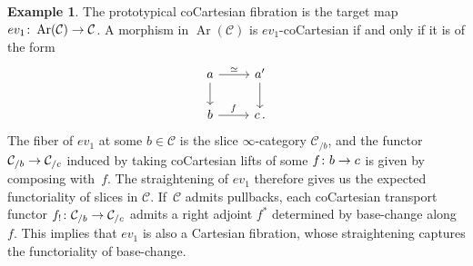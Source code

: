 \documentclass[10pt]{amsart}
\numberwithin{equation}{section}
\theoremstyle{definition}
\newtheorem{ex}[prop]{Example}
\DeclareMathOperator{\Ar}{Ar}
\newcommand{\cC}{\mathcal{C}}
\renewcommand{\to}{\mathchoice{\longrightarrow}{\rightarrow}{}{}}
\begin{document}
	\begin{ex}\label{ex:ev_0_is_cocart}
		The prototypical coCartesian fibration is the target map $ev_{1}\colon \Ar(\cC) \to \cC$.
    A morphism in $\Ar(\cC)$ is $ev_{1}$-coCartesian if and only if it is of the form
		\begin{equation*}
			\begin{tikzcd}
				a \arrow[r, "\simeq"] \arrow[d]      &   a'  \arrow[d] \\
				b  \arrow[r, "f"]               &   c \, .
			\end{tikzcd}
		\end{equation*}
		The fiber of $ev_{1}$ at some $b\in \cC$ is the slice $\infty$-category $\cC_{/b}$, and the functor $\cC_{/b} \to \cC_{/c}$ induced by taking coCartesian lifts of some $f\colon b\to c$ is given by composing with~$f$.
    The straightening of $ev_{1}$ therefore gives us the expected functoriality of slices in $\cC$.
    If~$\cC$ admits pullbacks, each coCartesian transport functor $f_{!}\colon \cC_{/b}\to \cC_{/c}$ admits a right adjoint $f^{*}$ determined by base-change along $f$.
    This implies that $ev_{1}$ is also a Cartesian fibration, whose straightening captures the functoriality of base-change.
	\end{ex}
\end{document}
